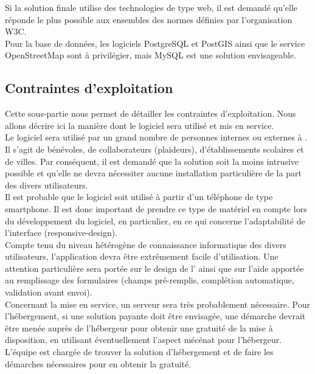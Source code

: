 Si la solution finale utilise des technologies de type web, il est demandé qu'elle réponde le plus possible aux ensembles des normes définies par l'organisation W3C.\\

Pour la base de données, les logiciels PostgreSQL et PostGIS ainsi que le service OpenStreetMap sont à privilégier, mais MySQL est une solution envisageable.\\





\subsection{Contraintes d'exploitation}
Cette sous-partie nous permet de détailler les contraintes d'exploitation. Nous allons décrire ici la manière dont le logiciel sera utilisé et mis en service.\\

Le logiciel sera utilisé par un grand nombre de personnes internes ou externes à \nomClient{}. Il s'agit de bénévoles, de collaborateurs (plaideurs), d'établissements scolaires et de villes. Par conséquent, il est demandé que la solution soit la moins intrusive possible et qu'elle ne devra nécessiter aucune installation particulière de la part des divers utilisateurs.\\

Il est probable que le logiciel soit utilisé à partir d'un téléphone de type smartphone. Il est donc important de prendre ce type de matériel en compte lors du développement du logiciel, en particulier, en ce qui concerne l'adaptabilité de l'interface (responsive-design).\\

Compte tenu du niveau hétérogène de connaissance informatique des divers utilisateurs, l'application devra être extrêmement facile d'utilisation. Une attention particulière sera portée sur le design de l'\IHM{} ainsi que sur l'aide apportée au remplissage des formulaires (champs pré-remplis, complétion automatique, validation avant envoi).\\

Concernant la mise en service, un serveur sera très probablement nécessaire. Pour l'hébergement, si une solution payante doit être envisagée, une démarche devrait être menée auprès de l'hébergeur pour obtenir une gratuité de la mise à disposition, en utilisant éventuellement l'aspect mécénat pour l'hébergeur. L'équipe \PICCourt{} est chargée de trouver la solution d'hébergement et de faire les démarches nécessaires pour en obtenir la gratuité.\\

